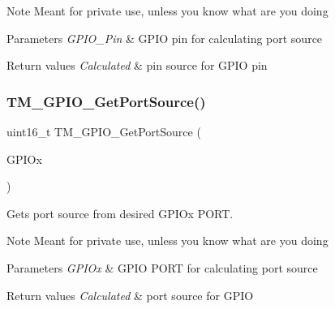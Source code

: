 \begin{DoxyNote}{Note}
Meant for private use, unless you know what are you doing 
\end{DoxyNote}

\begin{DoxyParams}{Parameters}
{\em G\+P\+I\+O\+\_\+\+Pin} & G\+P\+IO pin for calculating port source \\
\hline
\end{DoxyParams}

\begin{DoxyRetVals}{Return values}
{\em Calculated} & pin source for G\+P\+IO pin \\
\hline
\end{DoxyRetVals}
\mbox{\label{group___t_m___g_p_i_o___functions_gaa5a2f30f33cc19408daeb5db3b7cb59c}} 
\subsubsection{\texorpdfstring{T\+M\+\_\+\+G\+P\+I\+O\+\_\+\+Get\+Port\+Source()}{TM\_GPIO\_GetPortSource()}}
{\footnotesize\ttfamily uint16\+\_\+t T\+M\+\_\+\+G\+P\+I\+O\+\_\+\+Get\+Port\+Source (\begin{DoxyParamCaption}\item[{G\+P\+I\+O\+\_\+\+Type\+Def $\ast$}]{G\+P\+I\+Ox }\end{DoxyParamCaption})}



Gets port source from desired G\+P\+I\+Ox P\+O\+RT. 

\begin{DoxyNote}{Note}
Meant for private use, unless you know what are you doing 
\end{DoxyNote}

\begin{DoxyParams}{Parameters}
{\em G\+P\+I\+Ox} & G\+P\+IO P\+O\+RT for calculating port source \\
\hline
\end{DoxyParams}

\begin{DoxyRetVals}{Return values}
{\em Calculated} & port source for G\+P\+IO \\
\hline
\end{DoxyRetVals}
\mbox{\label{group___t_m___g_p_i_o___functions_ga8fc67a53f59d23b221e82a4a71642f30}} 
